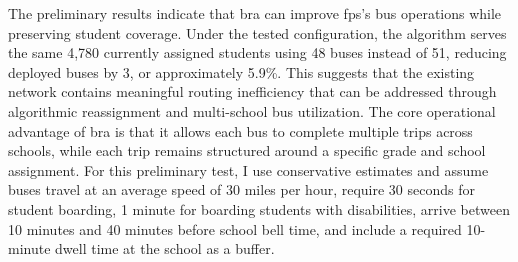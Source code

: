 The preliminary results indicate that \gls{bra} can improve \gls{fps}'s bus operations while preserving student coverage. Under the tested configuration, the algorithm serves the same 4,780 currently assigned students using 48 buses instead of 51, reducing deployed buses by 3, or approximately 5.9\%. This suggests that the existing network contains meaningful routing inefficiency that can be addressed through algorithmic reassignment and multi-school bus utilization. The core operational advantage of \gls{bra} is that it allows each bus to complete multiple trips across schools, while each trip remains structured around a specific grade and school assignment. For this preliminary test, I use conservative estimates and assume buses travel at an average speed of 30 miles per hour, require 30 seconds for student boarding, 1 minute for boarding students with disabilities, arrive between 10 minutes and 40 minutes before school bell time, and include a required 10-minute dwell time at the school as a buffer.

\begin{table}[!htbp]
    \caption{Estimated travel times in minutes for currently assigned riders under current routing versus the \gls{bra} configuration. Does not account for intersection delay, assumes constant bus speed.}
    \label{tab:travel_times}
\end{table}

